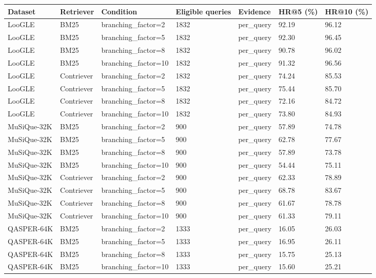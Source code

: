 \begin{tabular}{lllllll}
\hline
Dataset & Retriever & Condition & Eligible queries & Evidence & HR@5 (\%) & HR@10 (\%) \\
\hline
LooGLE & BM25 & branching\_factor=2 & 1832 & per\_query & 92.19 & 96.12 \\
LooGLE & BM25 & branching\_factor=5 & 1832 & per\_query & 92.30 & 96.45 \\
LooGLE & BM25 & branching\_factor=8 & 1832 & per\_query & 90.78 & 96.02 \\
LooGLE & BM25 & branching\_factor=10 & 1832 & per\_query & 91.32 & 96.56 \\
LooGLE & Contriever & branching\_factor=2 & 1832 & per\_query & 74.24 & 85.53 \\
LooGLE & Contriever & branching\_factor=5 & 1832 & per\_query & 75.44 & 85.70 \\
LooGLE & Contriever & branching\_factor=8 & 1832 & per\_query & 72.16 & 84.72 \\
LooGLE & Contriever & branching\_factor=10 & 1832 & per\_query & 73.80 & 84.93 \\
MuSiQue-32K & BM25 & branching\_factor=2 & 900 & per\_query & 57.89 & 74.78 \\
MuSiQue-32K & BM25 & branching\_factor=5 & 900 & per\_query & 62.78 & 77.67 \\
MuSiQue-32K & BM25 & branching\_factor=8 & 900 & per\_query & 57.89 & 73.78 \\
MuSiQue-32K & BM25 & branching\_factor=10 & 900 & per\_query & 54.44 & 75.11 \\
MuSiQue-32K & Contriever & branching\_factor=2 & 900 & per\_query & 62.33 & 78.89 \\
MuSiQue-32K & Contriever & branching\_factor=5 & 900 & per\_query & 68.78 & 83.67 \\
MuSiQue-32K & Contriever & branching\_factor=8 & 900 & per\_query & 61.67 & 78.78 \\
MuSiQue-32K & Contriever & branching\_factor=10 & 900 & per\_query & 61.33 & 79.11 \\
QASPER-64K & BM25 & branching\_factor=2 & 1333 & per\_query & 16.05 & 26.03 \\
QASPER-64K & BM25 & branching\_factor=5 & 1333 & per\_query & 16.95 & 26.11 \\
QASPER-64K & BM25 & branching\_factor=8 & 1333 & per\_query & 15.75 & 25.13 \\
QASPER-64K & BM25 & branching\_factor=10 & 1333 & per\_query & 15.60 & 25.21 \\

\end{tabular}
